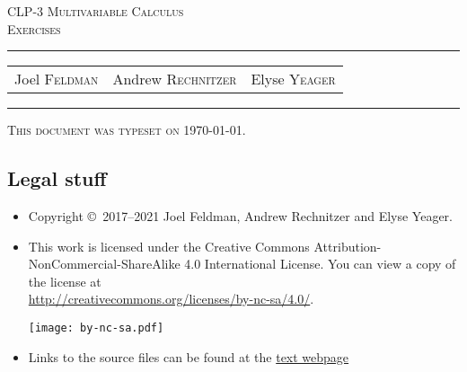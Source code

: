 \documentclass[12pt,letterpaper, openany]{book}
\makeatletter
\newcommand{\reqnomode}{\tagsleft@false}
\makeatother
\begin{document}
\reqnomode

\setcounter{page}{0}

\begin{titlepage}
\begin{center}
\textsc{\LARGE
CLP-3 Multivariable Calculus\\[2ex]
Exercises
}\\[2ex]

\vspace{5ex}
\hrule
\vspace{5ex}

\begin{tabular}{ccc}
\large  Joel \textsc{Feldman}
& \large \qquad Andrew \textsc{Rechnitzer}
&\large  \qquad Elyse \textsc{Yeager}
\end{tabular}

\end{center}
\vspace{2ex}
\hrule

\vfill
\textsc{This document was typeset on \today.}
\end{titlepage}

\subsection*{Legal stuff}
\begin{itemize}
 \item Copyright \copyright\ 2017--2021 Joel Feldman, Andrew Rechnitzer and Elyse Yeager.
\item This work is licensed under the
Creative Commons Attribution-NonCommercial-ShareAlike 4.0 International
License. You can view a copy of the license at \\
\url{http://creativecommons.org/licenses/by-nc-sa/4.0/}.
\begin{center}
 \texttt{[image: by-nc-sa.pdf]}
\end{center}
\item Links to the source files can be found at the \href{http://www.math.ubc.ca/~CLP/index.html}{text webpage}
\end{itemize}
\newpage
\end{document}

